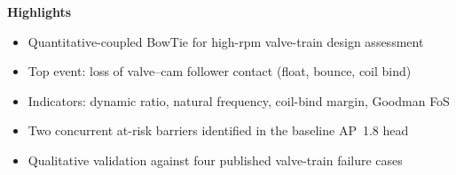 \documentclass[11pt,a4paper]{article}
\begin{document}
\begin{center}
{\Large\bfseries Highlights\par}
\end{center}

\bigskip

\begin{itemize}\setlength{\itemsep}{0.4em}
\item Quantitative-coupled BowTie for high-rpm valve-train design assessment
\item Top event: loss of valve--cam follower contact (float, bounce, coil bind)
\item Indicators: dynamic ratio, natural frequency, coil-bind margin, Goodman FoS
\item Two concurrent at-risk barriers identified in the baseline AP~1.8 head
\item Qualitative validation against four published valve-train failure cases
\end{itemize}
\end{document}

